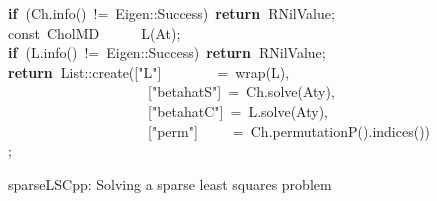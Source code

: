\documentclass[shortnames,article]{jss}
\newcommand{\hlstd}[1]{\textcolor[rgb]{0,0,0}{#1}}
\newcommand{\hlopt}[1]{\textcolor[rgb]{0,0,0}{#1}}
\newcommand{\hlstr}[1]{\textcolor[rgb]{0.90,0.15,0.15}{#1}}
\newcommand{\hlkwa}[1]{\textcolor[rgb]{0.61,0.13,0.93}{\bf{#1}}}
\newcommand{\hlkwb}[1]{\textcolor[rgb]{0.13,0.54,0.13}{#1}}
\newcommand{\hlkwd}[1]{\textcolor[rgb]{0,0,0}{#1}}
\begin{document}
\begin{figure}[htb]
    \hlstd{}\hlkwa{if\ }\hlstd{}\hlopt{(}\hlstd{Ch}\hlopt{.}\hlstd{}\hlkwd{info}\hlstd{}\hlopt{()\ !=\ }\hlstd{Eigen}\hlopt{::}\hlstd{Success}\hlopt{)\ }\hlstd{}\hlkwa{return\ }\hlstd{R\textunderscore NilValue}\hlopt{;}\hspace*{\fill}\\
    \hlstd{}\hlkwb{const\ }\hlstd{CholMD}\hlstd{\ \ \ \ \ \ }\hlstd{}\hlkwd{L}\hlstd{}\hlopt{(}\hlstd{At}\hlopt{);}\hspace*{\fill}\\
    \hlstd{}\hlkwa{if\ }\hlstd{}\hlopt{(}\hlstd{L}\hlopt{.}\hlstd{}\hlkwd{info}\hlstd{}\hlopt{()\ !=\ }\hlstd{Eigen}\hlopt{::}\hlstd{Success}\hlopt{)\ }\hlstd{}\hlkwa{return\ }\hlstd{R\textunderscore NilValue}\hlopt{;}\hspace*{\fill}\\
    \hlstd{}\hlkwa{return\ }\hlstd{List}\hlopt{::}\hlstd{}\hlkwd{create}\hlstd{}\hlopt{(}\hlstd{\textunderscore }\hlopt{{[}}\hlstd{}\hlstr{"L"}\hlstd{}\hlopt{{]}}\hlstd{\ \ \ \ \ \ \ \ }\hlopt{=\ }\hlstd{}\hlkwd{wrap}\hlstd{}\hlopt{(}\hlstd{L}\hlopt{),}\hspace*{\fill}\\
    \hlstd{}\hlstd{\ \ \ \ \ \ \ \ \ \ \ \ \ \ \ \ \ \ \ \ }\hlstd{\textunderscore }\hlopt{{[}}\hlstd{}\hlstr{"betahatS"}\hlstd{}\hlopt{{]}\ =\ }\hlstd{Ch}\hlopt{.}\hlstd{}\hlkwd{solve}\hlstd{}\hlopt{(}\hlstd{Aty}\hlopt{),}\hspace*{\fill}\\
    \hlstd{}\hlstd{\ \ \ \ \ \ \ \ \ \ \ \ \ \ \ \ \ \ \ \ }\hlstd{\textunderscore }\hlopt{{[}}\hlstd{}\hlstr{"betahatC"}\hlstd{}\hlopt{{]}\ =\ }\hlstd{L}\hlopt{.}\hlstd{}\hlkwd{solve}\hlstd{}\hlopt{(}\hlstd{Aty}\hlopt{),}\hspace*{\fill}\\
    \hlstd{}\hlstd{\ \ \ \ \ \ \ \ \ \ \ \ \ \ \ \ \ \ \ \ }\hlstd{\textunderscore }\hlopt{{[}}\hlstd{}\hlstr{"perm"}\hlstd{}\hlopt{{]}}\hlstd{\ \ \ \ \ }\hlopt{=\ }\hlstd{Ch}\hlopt{.}\hlstd{}\hlkwd{permutationP}\hlstd{}\hlopt{().}\hlstd{}\hlkwd{indices}\hlstd{}\hlopt{());}\hlstd{}\hspace*{\fill}\\
    \mbox{}
    \normalfont
    \normalsize
  \caption{sparseLSCpp: Solving a sparse least squares problem}
  \label{fig:spLS}
\end{figure}
\end{document}
